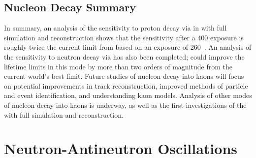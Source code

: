 \subsection{Nucleon Decay Summary}
\label{sec:ndksummary}

In summary, an analysis of the sensitivity to proton decay via \ptoknubar in  with full simulation and reconstruction shows that the sensitivity after a \SI{400}{\ktyr} exposure
is roughly twice the current limit from \superk based on an exposure of \SI{260}{\ktyr}~\cite{Abe:2014mwa}.  
An analysis of the sensitivity to neutron decay via \ntoek has also been completed;  could improve the lifetime limits in this mode by more than two orders of magnitude from the current world's best limit.  Future studies of nucleon decay into kaons will focus on potential improvements in track reconstruction, improved methods of particle and event identification, and understanding kaon  models.  
Analysis of other modes of nucleon decay into kaons is underway, as well as the first investigations of the \ptoepizero with full simulation and reconstruction.



\section{Neutron-Antineutron Oscillations}
\label{sec:nonaccel-nnbar}

